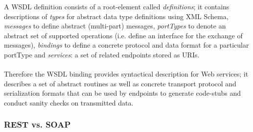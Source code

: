 A WSDL definition consists of a root-element called \emph{definitions}; it contains descriptions of \emph{types} for abstract data type definitions using XML Schema, \emph{messages} to define abstract (multi-part) messages, \emph{portTypes} to denote an abstract set of supported operations (i.e. define an interface for the exchange of messages), \emph{bindings} to define a concrete protocol and data format for a particular portType and \emph{services}: a set of related endpoints stored as URIs.
\\ \\
Therefore the WSDL binding provides syntactical description for Web services; it describes a set of abstract routines as well as concrete transport protocol and serialization formats that can be used by endpoints to generate code-stubs and conduct sanity checks on transmitted data. \cite{BIGREST}

\subsubsection{REST vs. SOAP}

